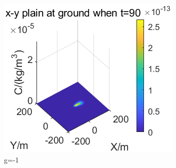 \documentclass{article}
\begin{document}
\begin{figure}[htbp]
		\begin{minipage}{0.33\textwidth}
			\includegraphics[width=\textwidth]{pics/g=-1,t=90.png}
		\end{minipage}
		\caption{g=-1}
		\label{fig21}
	\end{figure}
\end{document}
